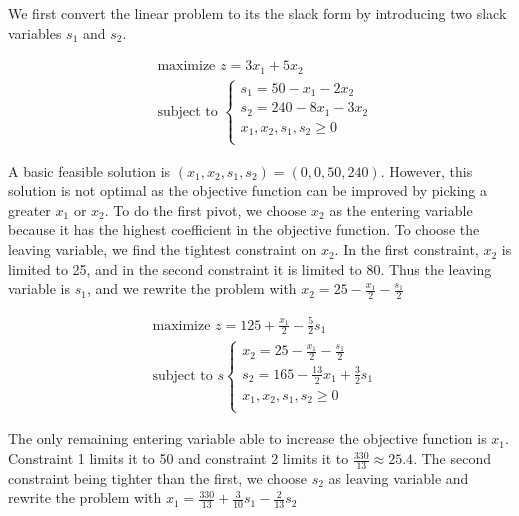 \documentclass[a4paper, 10pt, twoside]{article}
\begin{document}
\begin{enumerate}[a)]
          We first convert the linear problem to its the slack form by introducing two slack variables $s_1$ and $s_2$.

          \begin{align*}
               & \text{maximize } z = 3x_1 + 5x_2 \\
               & \text{subject to }
              \begin{cases}
                  s_1 = 50 - x_1 - 2x_2    \\
                  s_2 = 240 - 8x_1 - 3x_2  \\
                  x_1, x_2, s_1, s_2 \ge 0 \\
              \end{cases}
          \end{align*}

          A basic feasible solution is $(x_1, x_2, s_1, s_2) = (0, 0, 50, 240)$. However, this solution is not optimal as the objective function can be improved by picking a greater $x_1$ or $x_2$. To do the first pivot, we choose $x_2$ as the entering variable because it has the highest coefficient in the objective function. To choose the leaving variable, we find the tightest constraint on $x_2$. In the first constraint, $x_2$ is limited to 25, and in the second constraint it is limited to 80. Thus the leaving variable is $s_1$, and we rewrite the problem with $x_2 = 25 - \frac{x_1}{2} - \frac{s_1}{2}$

          \begin{align*}
               & \text{maximize } z = 125 + \frac{x_1}{2} - \frac{5}{2}s_1 \\
               & \text{subject to }s
              \begin{cases}
                  x_2 = 25 - \frac{x_1}{2} - \frac{s_1}{2}     \\
                  s_2 = 165 - \frac{13}{2}x_1 + \frac{3}{2}s_1 \\
                  x_1, x_2, s_1, s_2 \ge 0                     \\
              \end{cases}
          \end{align*}

          The only remaining entering variable able to increase the objective function is $x_1$. Constraint 1 limits it to 50 and constraint 2 limits it to $\frac{330}{13} \approx 25.4$. The second constraint being tighter than the first, we choose $s_2$ as leaving variable and rewrite the problem with $x_1=\frac{330}{13}+\frac{3}{10}s_1-\frac{2}{13}s_2$


\end{enumerate}
\end{document}
